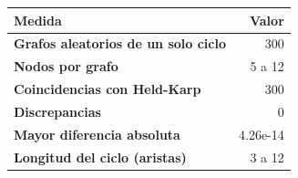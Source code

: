\renewcommand{\arraystretch}{1.2}
\begin{tabular}{|l|r|}
\hline
\rowcolor{gray!20} \textbf{Medida} & \textbf{Valor} \\
\hline
\textbf{Grafos aleatorios de un solo ciclo} & 300 \\
\hline
\textbf{Nodos por grafo} & 5 a 12 \\
\hline
\textbf{Coincidencias con Held-Karp} & 300 \\
\hline
\textbf{Discrepancias} & 0 \\
\hline
\textbf{Mayor diferencia absoluta} & 4.26e-14 \\
\hline
\textbf{Longitud del ciclo (aristas)} & 3 a 12 \\
\hline
\end{tabular}
